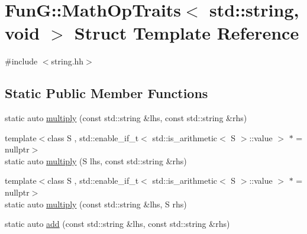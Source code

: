 \hypertarget{structFunG_1_1MathOpTraits_3_01std_1_1string_00_01void_01_4}{\section{Fun\-G\-:\-:Math\-Op\-Traits$<$ std\-:\-:string, void $>$ Struct Template Reference}
\label{structFunG_1_1MathOpTraits_3_01std_1_1string_00_01void_01_4}
}


{\ttfamily \#include $<$string.\-hh$>$}

\subsection*{Static Public Member Functions}
\begin{DoxyCompactItemize}
\item 
static auto \hyperlink{structFunG_1_1MathOpTraits_3_01std_1_1string_00_01void_01_4_aa6807355068e30da33440e446040f5bb}{multiply} (const std\-::string \&lhs, const std\-::string \&rhs)
\item 
{\footnotesize template$<$class S , std\-::enable\-\_\-if\-\_\-t$<$ std\-::is\-\_\-arithmetic$<$ S $>$\-::value $>$ $\ast$  = nullptr$>$ }\\static auto \hyperlink{structFunG_1_1MathOpTraits_3_01std_1_1string_00_01void_01_4_a86b78e911b4a7f31e1e626c75f328460}{multiply} (S lhs, const std\-::string \&rhs)
\item 
{\footnotesize template$<$class S , std\-::enable\-\_\-if\-\_\-t$<$ std\-::is\-\_\-arithmetic$<$ S $>$\-::value $>$ $\ast$  = nullptr$>$ }\\static auto \hyperlink{structFunG_1_1MathOpTraits_3_01std_1_1string_00_01void_01_4_a6481e1b14e056fed96beba96531ac192}{multiply} (const std\-::string \&lhs, S rhs)
\item 
static auto \hyperlink{structFunG_1_1MathOpTraits_3_01std_1_1string_00_01void_01_4_aca8b35c9ba959901550878e22eeeda06}{add} (const std\-::string \&lhs, const std\-::string \&rhs)
\end{DoxyCompactItemize}


